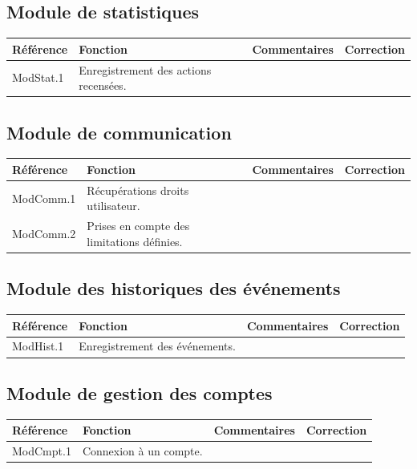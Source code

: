 \documentclass[10pt,a4paper,landscape]{report}
\begin{document}
\subsection{Module de statistiques}

\begin{center}
	\bgroup
	\def\arraystretch{1.5}
	\begin{tabular}{|p{2.5cm}|p{8cm}|p{8cm}|p{8cm}|}
		\hline
		\rowcolor{gris}Référence & Fonction & Commentaires & Correction\\
		\hline
		ModStat.1 & Enregistrement des actions recensées. & & \\
		\hline
	\end{tabular}
	\egroup
\end{center}


\subsection{Module de communication}

\begin{center}
	\bgroup
	\def\arraystretch{1.5}
	\begin{tabular}{|p{2.5cm}|p{8cm}|p{8cm}|p{8cm}|}
		\hline
		\rowcolor{gris}Référence & Fonction & Commentaires & Correction\\
		\hline
		ModComm.1 & Récupérations droits utilisateur. & & \\
		\hline
		ModComm.2 & Prises en compte des limitations définies. & & \\
		\hline
	\end{tabular}
	\egroup
\end{center}


\subsection{Module des historiques des événements}

\begin{center}
	\bgroup
	\def\arraystretch{1.5}
	\begin{tabular}{|p{2.5cm}|p{8cm}|p{8cm}|p{8cm}|}
		\hline
		\rowcolor{gris}Référence & Fonction & Commentaires & Correction\\
		\hline
		ModHist.1 & Enregistrement des événements. & & \\
		\hline
	\end{tabular}
	\egroup
\end{center}


\subsection{Module de gestion des comptes}

\begin{center}
	\bgroup
	\def\arraystretch{1.5}
	\begin{tabular}{|p{2.5cm}|p{8cm}|p{8cm}|p{8cm}|}
		\hline
		\rowcolor{gris}Référence & Fonction & Commentaires & Correction\\
		\hline
		ModCmpt.1 & Connexion à un compte. & & \\
		\hline
	\end{tabular}
	\egroup
\end{center}
\end{document}
